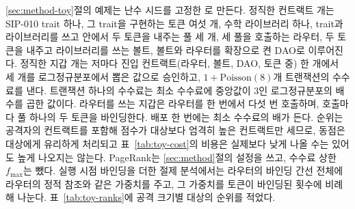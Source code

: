 \ref{sec:method-toy}절의 예제는 난수 시드를 고정한 로 만든다. 정직한 컨트랙트 \ToyContracts 개는 SIP-010 trait 하나, 그 trait을 구현하는 토큰 여섯 개, 수학 라이브러리 하나, trait과 라이브러리를 쓰고  안에서 두 토큰을 내주는 풀 세 개, 세 풀을 호출하는 라우터, 두 토큰을 내주고 라이브러리를 쓰는 볼트, 볼트와 라우터를 확장으로 켠 DAO로 이루어진다. 정직한 지갑 \ToyWallets 개는 저마다 진입 컨트랙트(라우터, 볼트, DAO, 토큰 중) 한 개에서 세 개를 로그정규분포에서 뽑은 값으로 승인하고, $1+\mathrm{Poisson}(8)$개 트랜잭션의 수수료를 낸다. 트랜잭션 하나의 수수료는 최소 수수료에 중앙값이 3인 로그정규분포의 배수를 곱한 값이다. 라우터를 쓰는 지갑은 라우터를 한 번에서 다섯 번 호출하며, 호출마다 풀 하나의 두 토큰을 바인딩한다. 배포 한 번에는 최소 수수료의 \ToyDeployFee 배가 든다. 순위는 공격자의 컨트랙트를 포함해 점수가 대상보다 엄격히 높은 컨트랙트만 세므로, 동점은 대상에게 유리하게 처리되고 표~\ref{tab:toy-cost}의 비용은 실제보다 낮게 나올 수는 있어도 높게 나오지는 않는다. PageRank는 \ref{sec:method}절의 설정을 쓰고, 수수료 상한 $f_{\max}$는 뺐다. 실행 시점 바인딩을 더한 절제 분석에서는 라우터의 바인딩 간선 전체에 라우터의 정적 참조와 같은 가중치를 주고, 그 가중치를 토큰이 바인딩된 횟수에 비례해 나눈다. 표~\ref{tab:toy-ranks}에 공격 크기별 대상의 순위를 적었다.

\begin{table}[htbp]
\centering
\caption{합성 예제에서 공격자 토큰이 전체 컨트랙트 가운데 차지하는 순위(1이 맨 위). $k$는 농장 컨트랙트(A1), 시빌 지갑(A2), 라우터 호출(A4)의 수이다. 열은 표~\ref{tab:toy-cost}의 순위 규칙으로, 차례로 호출자 수, 의존성 PageRank, 균등 재시작으로 Stacks에 옮긴 EndorseRank, \PCER, 실행 시점 trait 바인딩을 더한 .}
\label{tab:toy-ranks}
\small

\end{table}
